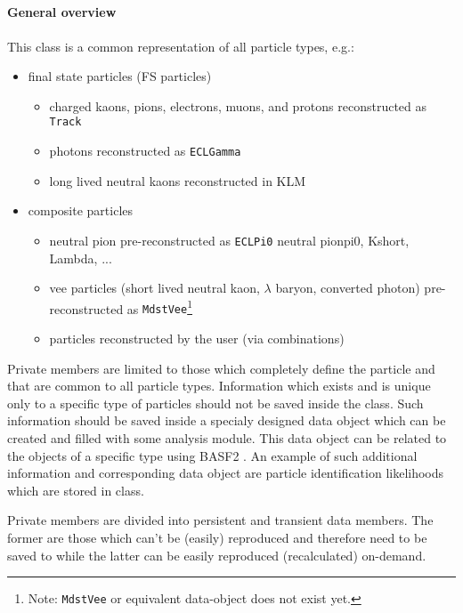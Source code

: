 \newpage
\subsection{\particle}

\paragraph{General overview}

This class is a common representation of all particle types, e.g.:
\begin{itemize}
 \item final state particles (FS particles)
 \begin{itemize}
  \item charged kaons, pions, electrons, muons, and protons reconstructed as {\tt Track}
  \item photons reconstructed as {\tt ECLGamma}
  \item long lived neutral kaons reconstructed in KLM
 \end{itemize}
 \item composite particles
 \begin{itemize}
  \item neutral pion pre-reconstructed as {\tt ECLPi0} neutral pionpi0, Kshort, Lambda, ...
  \item vee particles (short lived neutral kaon, $\lambda$ baryon, converted photon) pre-reconstructed as {\tt MdstVee}\footnote{Note: 
  {\tt MdstVee} or equivalent data-object does not exist yet.}
 \item particles reconstructed by the user (via combinations)
 \end{itemize}
\end{itemize}

Private members are limited to those which completely define the particle and that are common to all particle types. Information which
exists and is unique only to a specific type of particles should not be saved inside the \particle class. Such information should be 
saved inside a specialy designed data object which can be created and filled with some analysis module. This data object can be
related to the \particle objects of a specific type using BASF2 \relation. An example of such additional information and corresponding
data object are particle identification likelihoods which are stored in \pidLikelihood class. 

Private members are divided into persistent and transient data members. The former are those which can't be (easily) reproduced and therefore need
to be saved to \mudst while the latter can be easily reproduced (recalculated) on-demand.

